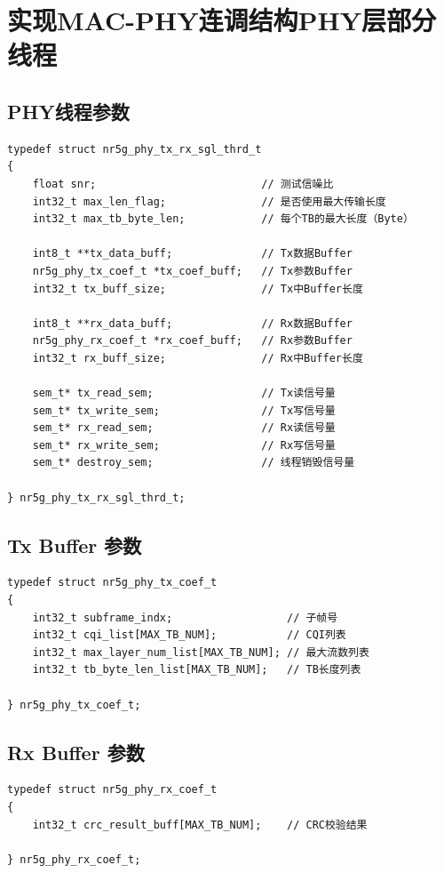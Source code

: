 \documentclass{article}
\begin{document}
\section{实现MAC-PHY连调结构PHY层部分线程}
\subsection{PHY线程参数}
\lstset{language=C++}
\begin{lstlisting}
typedef struct nr5g_phy_tx_rx_sgl_thrd_t
{
    float snr;                          // 测试信噪比
    int32_t max_len_flag;               // 是否使用最大传输长度
    int32_t max_tb_byte_len;            // 每个TB的最大长度（Byte）

    int8_t **tx_data_buff;              // Tx数据Buffer
    nr5g_phy_tx_coef_t *tx_coef_buff;   // Tx参数Buffer
    int32_t tx_buff_size;               // Tx中Buffer长度

    int8_t **rx_data_buff;              // Rx数据Buffer
    nr5g_phy_rx_coef_t *rx_coef_buff;   // Rx参数Buffer
    int32_t rx_buff_size;               // Rx中Buffer长度

    sem_t* tx_read_sem;                 // Tx读信号量
    sem_t* tx_write_sem;                // Tx写信号量
    sem_t* rx_read_sem;                 // Rx读信号量
    sem_t* rx_write_sem;                // Rx写信号量
    sem_t* destroy_sem;                 // 线程销毁信号量

} nr5g_phy_tx_rx_sgl_thrd_t;

\end{lstlisting}

\subsection{Tx Buffer 参数}
\lstset{language=C++}
\begin{lstlisting}
typedef struct nr5g_phy_tx_coef_t
{
    int32_t subframe_indx;                  // 子帧号
    int32_t cqi_list[MAX_TB_NUM];           // CQI列表
    int32_t max_layer_num_list[MAX_TB_NUM]; // 最大流数列表
    int32_t tb_byte_len_list[MAX_TB_NUM];   // TB长度列表

} nr5g_phy_tx_coef_t;

\end{lstlisting}

\subsection{Rx Buffer 参数}
\lstset{language=C++}
\begin{lstlisting}
typedef struct nr5g_phy_rx_coef_t
{
    int32_t crc_result_buff[MAX_TB_NUM];    // CRC校验结果

} nr5g_phy_rx_coef_t;

\end{lstlisting}
\end{document}
